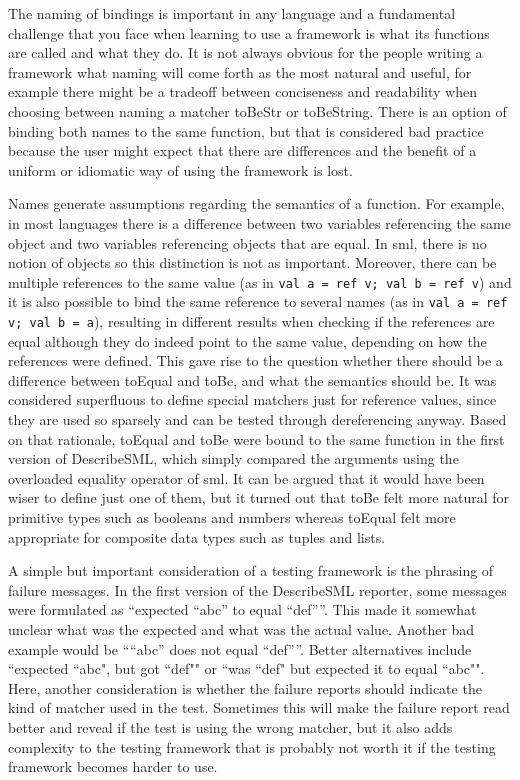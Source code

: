 \documentclass[11pt]{article}
\begin{document}
The naming of bindings is important in any language and a fundamental challenge that you face when learning to use a framework is what its functions are called and what they do. It is not always obvious for the people writing a framework what naming will come forth as the most natural and useful, for example there might be a tradeoff between conciseness and readability when choosing between naming a matcher toBeStr or toBeString. There is an option of binding both names to the same function, but that is considered bad practice because the user might expect that there are differences and the benefit of a uniform or idiomatic way of using the framework is lost.

Names generate assumptions regarding the semantics of a function. For example, in most languages there is a difference between two variables referencing the same object and two variables referencing objects that are equal. In \gls{sml}, there is no notion of objects so this distinction is not as important. Moreover, there can be multiple references to the same value (as in \texttt{val a = ref v; val b = ref v}) and it is also possible to bind the same reference to several names (as in \texttt{val a = ref v; val b = a}), resulting in different results when checking if the references are equal although they do indeed point to the same value, depending on how the references were defined. This gave rise to the question whether there should be a difference between toEqual and toBe, and what the semantics should be. It was considered superfluous to define special matchers just for reference values, since they are used so sparsely and can be tested through dereferencing anyway. Based on that rationale, toEqual and toBe were bound to the same function in the first version of DescribeSML, which simply compared the arguments using the overloaded equality operator of \gls{sml}. It can be argued that it would have been wiser to define just one of them, but it turned out that toBe felt more natural for primitive types such as booleans and numbers whereas toEqual felt more appropriate for composite data types such as tuples and lists.

A simple but important consideration of a testing framework is the phrasing of failure messages. In the first version of the DescribeSML reporter, some messages were formulated as ``expected ``abc'' to equal ``def''''. This made it somewhat unclear what was the expected and what was the actual value. Another bad example would be ````abc'' does not equal ``def''''. Better alternatives include ``expected ``abc", but got ``def"" or ``was ``def" but expected it to equal ``abc"". Here, another consideration is whether the failure reports should indicate the kind of \gls{matcher} used in the test. Sometimes this will make the failure report read better and reveal if the test is using the wrong \gls{matcher}, but it also adds complexity to the testing framework that is probably not worth it if the testing framework becomes harder to use.
\end{document}
